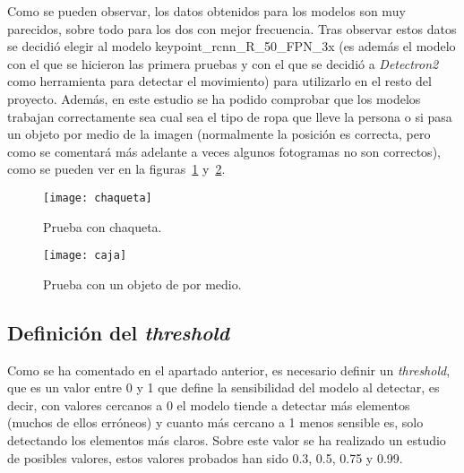 \begin{table}[h]
	\centering
\caption{Tabla con el estudio de los modelos de posición ordenado por ratio.}
\label{tab:modelos}
\end{table}

Como se pueden observar, los datos obtenidos para los modelos son muy parecidos, sobre todo para los dos con mejor frecuencia. Tras observar estos datos se decidió elegir al modelo keypoint\_rcnn\_R\_50\_FPN\_3x (es además el modelo con el que se hicieron las primera pruebas y con el que se decidió a \textit{Detectron2} como herramienta para detectar el movimiento) para utilizarlo en el resto del proyecto. Además, en este estudio se ha podido comprobar que los modelos trabajan correctamente sea cual sea el tipo de ropa que lleve la persona o si pasa un objeto por medio de la imagen (normalmente la posición es correcta, pero como se comentará más adelante a veces algunos fotogramas no son correctos), como se pueden ver en la figuras~\ref{fig:chaqueta} y~\ref{fig:caja}.

\begin{figure}[h]
	\centering
	\texttt{[image: chaqueta]}
	\caption{Prueba con chaqueta.}
	\label{fig:chaqueta}
\end{figure}

\begin{figure}[h]
	\centering
	\texttt{[image: caja]}
	\caption{Prueba con un objeto de por medio.}
	\label{fig:caja}
\end{figure}


\subsection{Definición del \textit{threshold}}
Como se ha comentado en el apartado anterior, es necesario definir un \textit{threshold}, que es un valor entre 0 y 1 que define la sensibilidad del modelo al detectar, es decir, con valores cercanos a 0 el modelo tiende a detectar más elementos (muchos de ellos erróneos) y cuanto más cercano a 1 menos sensible es, solo detectando los elementos más claros. Sobre este valor se ha realizado un estudio de posibles valores, estos valores probados han sido 0.3, 0.5, 0.75 y 0.99.

